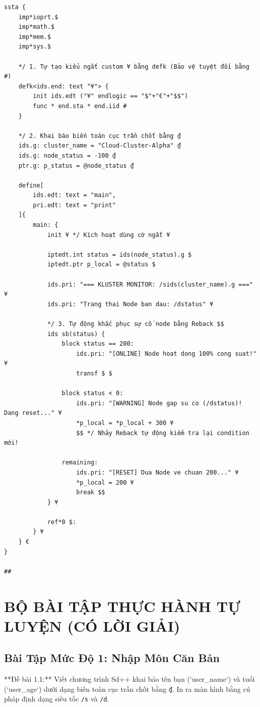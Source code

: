 \documentclass[11pt, a4paper]{article}
\begin{document}
\begin{lstlisting}[caption={Ứng dụng quản lý máy chủ Auto-Healing quy mô lớn}]
ssta {
    imp*ioprt.$
    imp*math.$
    imp*mem.$
    imp*sys.$

    */ 1. Tự tạo kiểu ngắt custom ¥ bằng defk (Bảo vệ tuyệt đối bằng #)
    defk<ids.end: text "¥"> {
        init ids.edt ("¥" endlogic == "$"+"€"+"$$") 
        func * end.sta * end.iid #
    }

    */ 2. Khai báo biến toàn cục trần chốt bằng ₫
    ids.g: cluster_name = "Cloud-Cluster-Alpha" ₫
    ids.g: node_status = -100 ₫
    ptr.g: p_status = @node_status ₫

    define[
        ids.edt: text = "main",
        pri.edt: text = "print"
    ]{
        main: {
            init ¥ */ Kích hoạt dùng cờ ngắt ¥

            iptedt.int status = ids(node_status).g $
            iptedt.ptr p_local = @status $

            ids.pri: "=== KLUSTER MONITOR: /sids(cluster_name).g ===" ¥
            ids.pri: "Trang thai Node ban dau: /dstatus" ¥

            */ 3. Tự động khắc phục sự cố node bằng Reback $$
            ids sb(status) {
                block status == 200:
                    ids.pri: "[ONLINE] Node hoat dong 100% cong suat!" ¥
                    transf $ $

                block status < 0:
                    ids.pri: "[WARNING] Node gap su co (/dstatus)! Dang reset..." ¥
                    *p_local = *p_local + 300 ¥
                    $$ */ Nhảy Reback tự động kiểm tra lại condition mới!

                remaining:
                    ids.pri: "[RESET] Dua Node ve chuan 200..." ¥
                    *p_local = 200 ¥
                    break $$
            } ¥

            ref*0 $:
        } ¥
    } €
}

##
\end{lstlisting}

\section{BỘ BÀI TẬP THỰC HÀNH TỰ LUYỆN (CÓ LỜI GIẢI)}

\subsection{Bài Tập Mức Độ 1: Nhập Môn Căn Bản}
**Đề bài 1.1:** Viết chương trình Sd++ khai báo tên bạn (`user_name`) và tuổi (`user_age`) dưới dạng biến toàn cục trần chốt bằng \texttt{₫}. In ra màn hình bằng cú pháp định dạng siêu tốc \texttt{/s} và \texttt{/d}.
\end{document}
